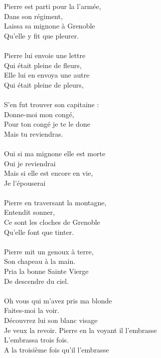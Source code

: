 
 Pierre est parti pour la l'armée,
\\Dans son régiment,
\\Laissa sa mignone à Grenoble
\\Qu'elle y fit que pleurer. \bissimple
\\\\Pierre lui envoie une lettre
\\Qui était pleine de fleurs,
\\Elle lui en envoya une autre
\\Qui était pleine de pleurs,  \bissimple
\\\\S'en fut trouver son capitaine :
\\Donne-moi mon congé,
\\Pour ton congé je te le done
\\Mais tu reviendras.  \bissimple
\\\\Oui si ma mignone elle est morte
\\Oui je reviendrai
\\Mais si elle est encore en vie,
\\Je l'épouserai  \bissimple
\\\\Pierre en traversant la montagne,
\\Entendit sonner,
\\Ce sont les cloches de Grenoble
\\Qu'elle font que tinter.  \bissimple
\\\\Pierre mit un genoux à terre,
\\Son chapeau à la main.
\\Pria la bonne Sainte Vierge
\\De descendre du ciel.  \bissimple
\\\\Oh vous qui m'avez pris ma blonde
\\Faites-moi la voir.
\\Découvrez lui son blanc visage
\\Je veux la revoir.  \bissimple
\breakpage
Pierre en la voyant il l'embrasse
\\L'embrassa trois fois.
\\A la troisième fois qu'il l'embrasse
